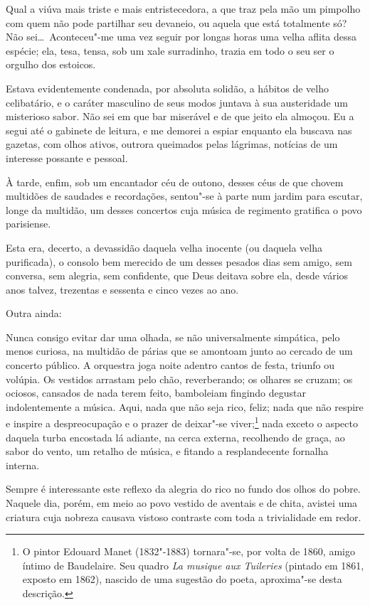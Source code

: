 Qual a viúva mais triste e mais entristecedora, a que traz pela mão
um pimpolho com quem não pode partilhar seu devaneio, ou aquela que
está totalmente só? Não sei\ldots\  Aconteceu"-me uma vez seguir por
longas horas uma velha aflita dessa espécie; ela, tesa, tensa, sob um
xale surradinho, trazia em todo o seu ser o orgulho dos estoicos.

Estava evidentemente condenada, por absoluta solidão, a hábitos
de velho celibatário, e o caráter masculino de seus modos 
juntava à sua austeridade um misterioso sabor. Não sei em que
bar miserável e de que jeito ela almoçou. Eu a segui até o gabinete de
leitura, e me demorei a espiar enquanto ela buscava nas gazetas,
com olhos ativos, outrora queimados pelas lágrimas, notícias de um
interesse possante e pessoal.

À tarde, enfim, sob um encantador céu de outono, desses céus de que chovem multidões de saudades e recordações, sentou"-se à parte num
jardim para escutar, longe da multidão, um desses concertos cuja
música de regimento gratifica o povo parisiense.

Esta era, decerto, a devassidão daquela velha inocente (ou daquela velha
purificada), o consolo bem merecido de um desses pesados dias sem
amigo, sem conversa, sem alegria, sem confidente, que Deus deitava 
sobre ela, desde
vários anos talvez, trezentas e sessenta e cinco vezes ao ano.

Outra ainda:

Nunca consigo evitar dar uma olhada, se não universalmente simpática,
pelo menos curiosa, na multidão de párias que se amontoam junto ao
cercado de um concerto público. A orquestra joga noite adentro cantos de festa, triunfo ou volúpia. Os vestidos arrastam pelo chão, reverberando; os
olhares se cruzam; os ociosos, cansados de nada terem feito, bamboleiam fingindo degustar indolentemente a música. Aqui, nada que
não seja rico, feliz; nada que não respire e inspire a despreocupação e o
prazer de deixar"-se viver;\footnote{ O pintor Edouard Manet (1832"-1883) tornara"-se, por volta de 1860,
amigo íntimo de Baudelaire. Seu quadro \textit{La musique aux Tuileries}
(pintado em 1861, exposto em 1862), nascido de uma sugestão do poeta,
aproxima"-se desta descrição.} nada exceto o aspecto
daquela turba encostada lá adiante, na cerca externa, recolhendo de graça,
ao sabor do vento, um retalho de música, e fitando a resplandecente
fornalha interna.

Sempre é interessante este reflexo da alegria do rico no fundo dos
olhos do pobre. Naquele dia, porém, em meio ao povo vestido de aventais
e de chita, avistei uma criatura cuja nobreza causava vistoso contraste com
toda a trivialidade em redor.

